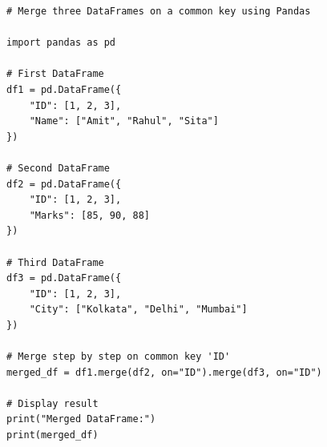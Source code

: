 \begin{verbatim}
# Merge three DataFrames on a common key using Pandas

import pandas as pd

# First DataFrame
df1 = pd.DataFrame({
    "ID": [1, 2, 3],
    "Name": ["Amit", "Rahul", "Sita"]
})

# Second DataFrame
df2 = pd.DataFrame({
    "ID": [1, 2, 3],
    "Marks": [85, 90, 88]
})

# Third DataFrame
df3 = pd.DataFrame({
    "ID": [1, 2, 3],
    "City": ["Kolkata", "Delhi", "Mumbai"]
})

# Merge step by step on common key 'ID'
merged_df = df1.merge(df2, on="ID").merge(df3, on="ID")

# Display result
print("Merged DataFrame:")
print(merged_df)
\end{verbatim}